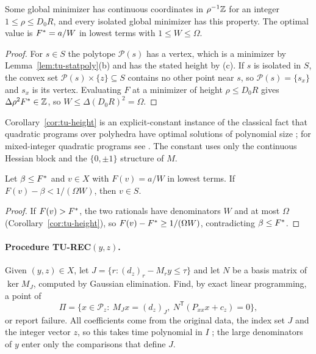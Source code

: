 \begin{corollary}\label{cor:tu-height}
Some global minimizer has continuous coordinates in $\rho^{-1}\mathbb Z$ for an
integer $1\le\rho\le D_0R$, and every isolated global minimizer has this
property. The optimal value is $F^*=a/W$ in lowest terms with $1\le W\le\Omega$.
\end{corollary}

\begin{proof}
For $s\in S$ the polytope $\mathcal P(s)$ has a vertex, which is a minimizer by
Lemma~\ref{lem:tu-statpoly}(b) and has the stated height by (c). If $s$ is
isolated in $S$, the convex set $\mathcal P(s)\times\{z\}\subseteq S$ contains
no other point near $s$, so $\mathcal P(s)=\{s_x\}$ and $s_x$ is its vertex.
Evaluating $F$ at a minimizer of height $\rho\le D_0R$ gives
$\Delta\rho^2F^*\in\mathbb Z$, so $W\le\Delta(D_0R)^2=\Omega$.
\end{proof}

Corollary~\ref{cor:tu-height} is an explicit-constant instance of the
classical fact that quadratic programs over polyhedra have optimal solutions
of polynomial size \cite{Vavasis1990}; for mixed-integer quadratic programs see
\cite{DelPiaDeyMolinaro2017}. The constant uses only the continuous Hessian
block and the $\{0,\pm1\}$ structure of $M$.

\begin{proposition}\label{prop:tu-accept}
Let $\beta\le F^*$ and $v\in X$ with $F(v)=a/W$ in lowest terms. If
$F(v)-\beta<1/(\Omega W)$, then $v\in S$.
\end{proposition}

\begin{proof}
If $F(v)>F^*$, the two rationals have denominators $W$ and at most $\Omega$
(Corollary~\ref{cor:tu-height}), so $F(v)-F^*\ge1/(\Omega W)$, contradicting
$\beta\le F^*$.
\end{proof}

\paragraph{Procedure TU-REC$(y,z)$.}
Given $(y,z)\in X$, let $J=\{r:(d_z)_r-M_ry\le\tau\}$ and let $N$ be a basis
matrix of $\ker M_J$, computed by Gaussian elimination. Find, by exact linear
programming, a point of
\[
\Pi=\bigl\{x\in\mathcal P_z:\ M_Jx=(d_z)_J,\ N^{\mathsf T}(P_{xx}x+c_z)=0\bigr\},
\]
or report failure. All coefficients come from the original data, the index
set $J$ and the integer vector $z$, so this takes time polynomial in $I$
\cite{GrotschelLovaszSchrijver1988}; the large denominators of
$y$ enter only the comparisons that define $J$.

